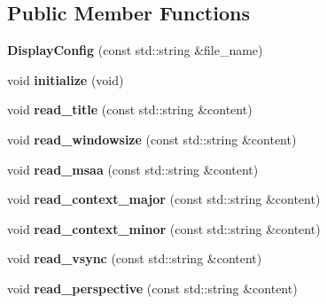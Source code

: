 \subsection*{Public Member Functions}
\begin{DoxyCompactItemize}
\item 
\hypertarget{classEngine_1_1DisplayConfig_a4e7905d09707c35596fd22707136588c}{}{\bfseries Display\+Config} (const std\+::string \&file\+\_\+name)\label{classEngine_1_1DisplayConfig_a4e7905d09707c35596fd22707136588c}

\item 
\hypertarget{classEngine_1_1DisplayConfig_abfa0fcd8c66497fe43f82dfdd2d2a4ae}{}void {\bfseries initialize} (void)\label{classEngine_1_1DisplayConfig_abfa0fcd8c66497fe43f82dfdd2d2a4ae}

\item 
\hypertarget{classEngine_1_1DisplayConfig_aa2901260dd6c24342ccee37412329e89}{}void {\bfseries read\+\_\+title} (const std\+::string \&content)\label{classEngine_1_1DisplayConfig_aa2901260dd6c24342ccee37412329e89}

\item 
\hypertarget{classEngine_1_1DisplayConfig_a8edf7a9d4f69fd5e84ac119b3f2b810c}{}void {\bfseries read\+\_\+windowsize} (const std\+::string \&content)\label{classEngine_1_1DisplayConfig_a8edf7a9d4f69fd5e84ac119b3f2b810c}

\item 
\hypertarget{classEngine_1_1DisplayConfig_a7bede44f27d1d00d1c9a2602600968c6}{}void {\bfseries read\+\_\+msaa} (const std\+::string \&content)\label{classEngine_1_1DisplayConfig_a7bede44f27d1d00d1c9a2602600968c6}

\item 
\hypertarget{classEngine_1_1DisplayConfig_ab6d633f0f8ac95853e197f9de2a5c048}{}void {\bfseries read\+\_\+context\+\_\+major} (const std\+::string \&content)\label{classEngine_1_1DisplayConfig_ab6d633f0f8ac95853e197f9de2a5c048}

\item 
\hypertarget{classEngine_1_1DisplayConfig_a8554ad75b0565963c3fd2994dd7665cf}{}void {\bfseries read\+\_\+context\+\_\+minor} (const std\+::string \&content)\label{classEngine_1_1DisplayConfig_a8554ad75b0565963c3fd2994dd7665cf}

\item 
\hypertarget{classEngine_1_1DisplayConfig_a844f9dcada077280c7e1d1b814138446}{}void {\bfseries read\+\_\+vsync} (const std\+::string \&content)\label{classEngine_1_1DisplayConfig_a844f9dcada077280c7e1d1b814138446}

\item 
\hypertarget{classEngine_1_1DisplayConfig_a2198b47c51f453ec77cc6040bc7e07f0}{}void {\bfseries read\+\_\+perspective} (const std\+::string \&content)\label{classEngine_1_1DisplayConfig_a2198b47c51f453ec77cc6040bc7e07f0}

\end{DoxyCompactItemize}
